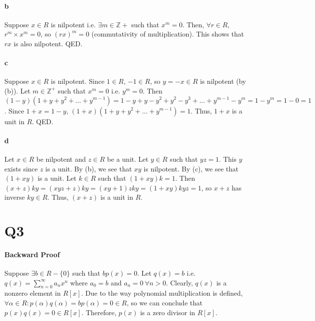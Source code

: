 \documentclass[]{article}
\begin{document}
	\paragraph{b}
	Suppose $x \in R$ is nilpotent i.e. $\exists m \in \mathbb{Z}+$ such that $x^m = 0$.\newline
	Then, $\forall r \in R$, $r^m \times x^m = 0$, so $(rx)^m = 0$ (commutativity of multiplication).\newline
	This shows that $rx$ is also nilpotent. QED.
	\paragraph{c}
	Suppose $x \in R$ is nilpotent.\newline
	Since $1 \in R$, $-1 \in R$, so $y = -x \in R$ is nilpotent (by (b)).\newline
	Let $m \in \mathbb{Z}^+$ such that $x^m = 0$ i.e. $y^m = 0$.\newline
	Then $(1 - y)(1 + y + y^2 + ... + y^{m-1}) = 1 - y + y - y^2 + y^2 - y^3 + ... + y^{m-1} - y^m = 1 - y^m = 1 - 0 = 1$.\newline
	Since $1 + x = 1 - y$, $(1 + x)(1 + y + y^2 + ... + y^{m-1}) = 1$.\newline
	Thus, $1 + x$ is a unit in $R$. QED.
	\paragraph{d}
	Let $x \in R$ be nilpotent and $z \in R$ be a unit.\newline
	Let $y \in R$ such that $yz = 1$. This $y$ exists since $z$ is a unit.\newline
	By (b), we see that $xy$ is nilpotent.\newline
	By (c), we see that $(1 + xy)$ is a unit.\newline
	Let $k \in R$ such that $(1 + xy)k = 1$.\newline
	Then $(x + z)ky = (xyz + z)ky = (xy + 1)zky = (1 + xy)kyz = 1$, so $x+z$ has inverse $ky \in R$.\newline
	Thus, $(x+z)$ is a unit in $R$.	

\section*{Q3}
	\paragraph{Backward Proof}
	Suppose $\exists b \in R - \{0\}$ such that $bp(x) = 0$.\newline
	Let $q(x) = b$ i.e. $q(x) = \sum_{n = 0}^{\infty} a_nx^n$ where $a_0 = b$ and $a_n = 0\ \forall n > 0$.\newline
	Clearly, $q(x)$ is a nonzero element in $R[x]$.\newline
	Due to the way polynomial multiplication is defined, $\forall \alpha \in R: p(\alpha)q(\alpha) = bp(\alpha) = 0 \in R$, so we can conclude that $p(x)q(x) = 0 \in R[x]$.\newline
	Therefore, $p(x)$ is a zero divisor in $R[x]$.
\end{document}
